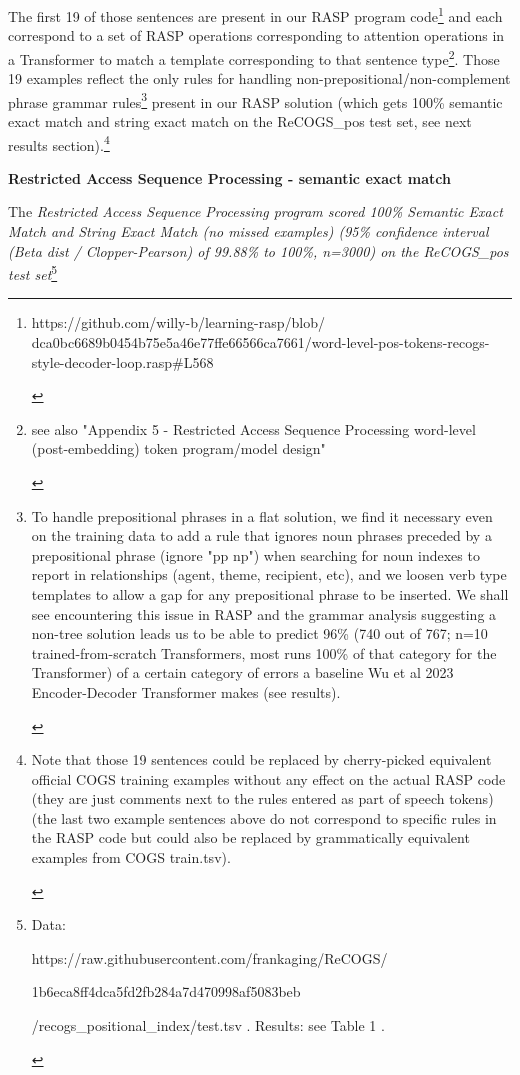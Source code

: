 \documentclass[11pt]{article}
\begin{document}
The first 19 of those sentences are present in our RASP program code\footnote{
\begin{tiny}
https://github.com/willy-b/learning-rasp/blob/
dca0bc6689b0454b75e5a46e77ffe66566ca7661/word-level-pos-tokens-recogs-style-decoder-loop.rasp\#L568\end{tiny}}
and each correspond to a set of RASP operations corresponding to attention operations in a Transformer to match a template corresponding to that sentence type\footnote{
\begin{tiny}
see also "Appendix 5 - Restricted Access Sequence Processing word-level (post-embedding) token program/model design"
\end{tiny}
}. Those 19 examples reflect the only rules for handling non-prepositional/non-complement phrase grammar rules\footnote{
\begin{tiny}
To handle prepositional phrases in a flat solution, we find it necessary even on the training data to add a rule that ignores noun phrases preceded by a prepositional phrase (ignore "pp np") when searching for noun indexes to report in relationships (agent, theme, recipient, etc), and we loosen verb type templates to allow a gap for any prepositional phrase to be inserted. We shall see encountering this issue in RASP and the grammar analysis suggesting a non-tree solution leads us to be able to predict 96\% (740 out of 767; n=10 trained-from-scratch Transformers, most runs 100\% of that category for the Transformer) of a certain category of errors a baseline Wu et al 2023 Encoder-Decoder Transformer makes (see results).
\end{tiny}
} present in our RASP solution (which gets 100\% semantic exact match and string exact match on the \cite{Wu2023} ReCOGS\_pos test set, see next results section).\footnote{\begin{tiny}
Note that those 19 sentences could be replaced by cherry-picked equivalent official COGS training examples without any effect on the actual RASP code (they are just comments next to the rules entered as part of speech tokens) (the last two example sentences above do not correspond to specific rules in the RASP code but could also be replaced by grammatically equivalent examples from COGS train.tsv).
\end{tiny}}

\textbf{ Restricted Access Sequence Processing - semantic exact match}

The \textit{Restricted Access Sequence Processing program scored 100\% Semantic Exact Match and String Exact Match (no missed examples) (95\% confidence interval (Beta dist / Clopper-Pearson) of 99.88\% to 100\%, n=3000) on the ReCOGS\_pos test set}\footnote{ 
\begin{tiny}
Data: 

https://raw.githubusercontent.com/frankaging/ReCOGS/

1b6eca8ff4dca5fd2fb284a7d470998af5083beb

/recogs\_positional\_index/test.tsv . Results: see Table 1 .
\end{tiny}
} 
\end{document}
